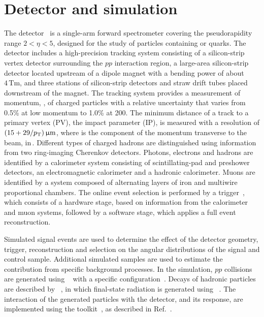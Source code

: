 \section{Detector and simulation}
\label{sec:Detector}

The \lhcb detector~\cite{Alves:2008zz,LHCb-DP-2014-002} is a single-arm forward
spectrometer covering the \mbox{pseudorapidity} range $2<\eta <5$,
designed for the study of particles containing \bquark or \cquark
quarks. The detector includes a high-precision tracking system
consisting of a silicon-strip vertex detector surrounding the $pp$
interaction region, a large-area silicon-strip detector located
upstream of a dipole magnet with a bending power of about
$4{\mathrm{\,Tm}}$, and three stations of silicon-strip detectors and straw
drift tubes placed downstream of the magnet.
The tracking system provides a measurement of momentum, \ptot, of charged particles with
a relative uncertainty that varies from 0.5\% at low momentum to 1.0\% at 200\gevc.
The minimum distance of a track to a primary vertex (PV), the impact parameter (IP), 
is measured with a resolution of $(15+29/\mbox{$p_{\mathrm{ T}}$}){\,\upmu\mathrm{m}}$,
where \pt is the component of the momentum transverse to the beam, in\,\gevc.
Different types of charged hadrons are distinguished using information
from two ring-imaging Cherenkov detectors. 
Photons, electrons and hadrons are identified by a calorimeter system consisting of
scintillating-pad and preshower detectors, an electromagnetic
calorimeter and a hadronic calorimeter. Muons are identified by a
system composed of alternating layers of iron and multiwire
proportional chambers.
The online event selection is performed by a trigger~\cite{LHCb-DP-2012-004}, 
which consists of a hardware stage, based on information from the calorimeter and muon
systems, followed by a software stage, which applies a full event
reconstruction.

Simulated signal events are used to determine the effect of the detector geometry, trigger, reconstruction and selection on the angular distributions of the signal and \LKJ control sample. Additional simulated samples are used to estimate the contribution from specific background processes.
In the simulation, $pp$ collisions are generated using
\pythia~\cite{Sjostrand:2006za,Sjostrand:2007gs} 
 with a specific \lhcb
configuration~\cite{LHCb-PROC-2010-056}.  Decays of hadronic particles
are described by \evtgen~\cite{Lange:2001uf}, in which final-state
radiation is generated using \photos~\cite{Golonka:2005pn}. The
interaction of the generated particles with the detector, and its response,
are implemented using the \geant
toolkit~\cite{Allison:2006ve}, as described in
Ref.~\cite{LHCb-PROC-2011-006}.
